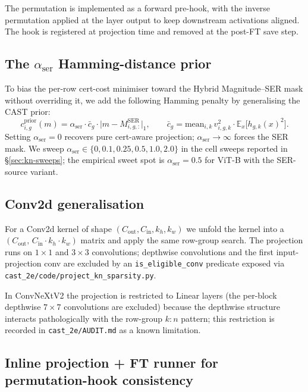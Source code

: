 \documentclass[11pt]{article}
\theoremstyle{plain}
\theoremstyle{definition}
\theoremstyle{remark}
\newcommand{\EE}{\mathbb{E}}
\newcommand{\1}{\mathbf{1}}
\begin{document}
The permutation is implemented as a forward pre-hook, with the inverse permutation applied at the layer output to keep downstream activations aligned. The hook is registered at projection time and removed at the post-FT save step.

\subsection{The \texorpdfstring{$\alpha_{\mathrm{ser}}$}{alpha-ser} Hamming-distance prior}
\label{subsec:alpha-ser}

To bias the per-row cert-cost minimiser toward the Hybrid Magnitude--SER mask without overriding it, we add the following Hamming penalty by generalising the CAST prior:
\begin{equation}
\label{eq:alpha-ser}
c^{\mathrm{prior}}_{i,g}(m) = \alpha_{\mathrm{ser}} \cdot \bar{c}_g \cdot \bigl| m - M^{\mathrm{SER}}_{i,g,:} \bigr|_1,
\qquad
\bar{c}_g = \mathrm{mean}_{i,k}\, v_{i,g,k}^2 \cdot \EE_x\bigl[h_{g,k}(x)^2\bigr].
\end{equation}
Setting $\alpha_{\mathrm{ser}}=0$ recovers pure cert-aware projection; $\alpha_{\mathrm{ser}} \to \infty$ forces the SER mask. We sweep $\alpha_{\mathrm{ser}} \in \{0, 0.1, 0.25, 0.5, 1.0, 2.0\}$ in the cell sweeps reported in \S\ref{sec:kn-sweeps}; the empirical sweet spot is $\alpha_{\mathrm{ser}} = 0.5$ for ViT-B with the SER-source variant.

\subsection{Conv2d generalisation}
\label{subsec:conv-pipeline}

For a Conv2d kernel of shape $(C_{\mathrm{out}}, C_{\mathrm{in}}, k_h, k_w)$ we unfold the kernel into a $(C_{\mathrm{out}},\, C_{\mathrm{in}} \cdot k_h \cdot k_w)$ matrix and apply the same row-group search. The projection runs on $1{\times}1$ and $3{\times}3$ convolutions; depthwise convolutions and the first input-projection conv are excluded by an \texttt{is\_eligible\_conv} predicate exposed via \texttt{cast\_2e/code/project\_kn\_sparsity.py}.

In ConvNeXtV2 the projection is restricted to Linear layers (the per-block depthwise $7{\times}7$ convolutions are excluded) because the depthwise structure interacts pathologically with the row-group $k{:}n$ pattern; this restriction is recorded in \texttt{cast\_2e/AUDIT.md} as a known limitation.

\subsection{Inline projection + FT runner for permutation-hook consistency}
\label{subsec:inline-ft}
\end{document}
